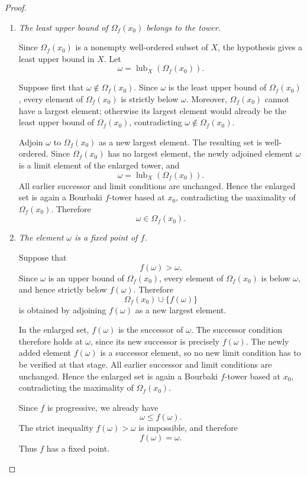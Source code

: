 \documentclass[11pt]{article}
\theoremstyle{definition}
\theoremstyle{remark}
\newcommand{\lub}{\operatorname{lub}}
\begin{document}
\begin{proof}
\begin{enumerate}
By the preceding three steps, \(\Omega_f(x_0)\) is a Bourbaki \(f\)-tower. Therefore
\[
\Omega_f(x_0)\in\mathcal T.
\]
It is clearly the largest element of \(\mathcal T\) under inclusion.

\item \emph{The least upper bound of \(\Omega_f(x_0)\) belongs to the tower.}

Since \(\Omega_f(x_0)\) is a nonempty well-ordered subset of \(X\), the hypothesis gives
a least upper bound in \(X\). Let
\[
\omega=\lub_X(\Omega_f(x_0)).
\]

Suppose first that \(\omega\notin\Omega_f(x_0)\). Since \(\omega\) is the least upper
bound of \(\Omega_f(x_0)\), every element of \(\Omega_f(x_0)\) is strictly below
\(\omega\). Moreover, \(\Omega_f(x_0)\) cannot have a largest element; otherwise its
largest element would already be the least upper bound of \(\Omega_f(x_0)\), contradicting
\(\omega\notin\Omega_f(x_0)\).

Adjoin \(\omega\) to \(\Omega_f(x_0)\) as a new largest element. The resulting set is
well-ordered. Since \(\Omega_f(x_0)\) has no largest element, the newly adjoined element
\(\omega\) is a limit element of the enlarged tower, and
\[
\omega=\lub_X(\Omega_f(x_0)).
\]
All earlier successor and limit conditions are unchanged. Hence the enlarged set is again
a Bourbaki \(f\)-tower based at \(x_0\), contradicting the maximality of
\(\Omega_f(x_0)\). Therefore
\[
\omega\in\Omega_f(x_0).
\]

\item \emph{The element \(\omega\) is a fixed point of \(f\).}

Suppose that
\[
f(\omega)>\omega.
\]
Since \(\omega\) is an upper bound of \(\Omega_f(x_0)\), every element of
\(\Omega_f(x_0)\) is below \(\omega\), and hence strictly below \(f(\omega)\). Therefore
\[
\Omega_f(x_0)\cup\{f(\omega)\}
\]
is obtained by adjoining \(f(\omega)\) as a new largest element.

In the enlarged set, \(f(\omega)\) is the successor of \(\omega\). The successor condition
therefore holds at \(\omega\), since its new successor is precisely \(f(\omega)\). The
newly added element \(f(\omega)\) is a successor element, so no new limit condition has to
be verified at that stage. All earlier successor and limit conditions are unchanged. Hence
the enlarged set is again a Bourbaki \(f\)-tower based at \(x_0\), contradicting the
maximality of \(\Omega_f(x_0)\).

Since \(f\) is progressive, we already have
\[
\omega\leq f(\omega).
\]
The strict inequality \(f(\omega)>\omega\) is impossible, and therefore
\[
f(\omega)=\omega.
\]
Thus \(f\) has a fixed point.
\end{enumerate}
\end{proof}
\end{document}

